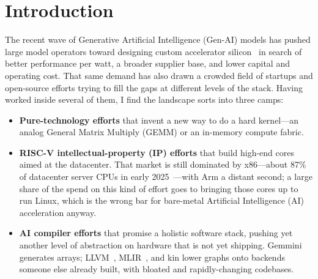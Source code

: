 \section{Introduction}
\label{sec:intro}



The recent wave of Generative Artificial Intelligence ({Gen-AI}) models has
pushed large model operators toward designing custom accelerator
silicon~\cite{openai2026jalapeno,carter2026anthropic} in search of better performance per watt, 
a broader supplier base, and lower capital and operating cost.
That same demand has also drawn a crowded field of startups and open-source
efforts trying to fill the gaps at different levels of the stack.
Having worked inside several of them, I find the landscape sorts into
three camps:

\begin{itemize}
  \item \textbf{Pure-technology efforts}
        that invent a new way to do a hard kernel---an analog General
        Matrix Multiply ({GEMM}) or an in-memory compute fabric.
  \item \textbf{{RISC-V} intellectual-property ({IP}) efforts}
        that build high-end cores aimed at the datacenter.
        That market is still dominated by x86---about 87\% of
        datacenter server {CPU}s in early
        2025~\cite{mercury2025q1}---with Arm a distant second;
        a large share of the spend on this kind of effort goes to bringing those 
        cores up to run Linux, which is the wrong bar for bare-metal Artificial
        Intelligence ({AI}) acceleration anyway.
  \item \textbf{{AI} compiler efforts}
        that promise a holistic software stack, pushing yet another level of abstraction
        on hardware that is not yet shipping.
        Gemmini~\cite{genc2021gemmini} generates arrays;
        {LLVM}~\cite{lattner2004llvm}, {MLIR}~\cite{lattner2021mlir},
        and kin lower graphs onto backends someone else already built,
        with bloated and rapidly-changing codebases.
\end{itemize}

